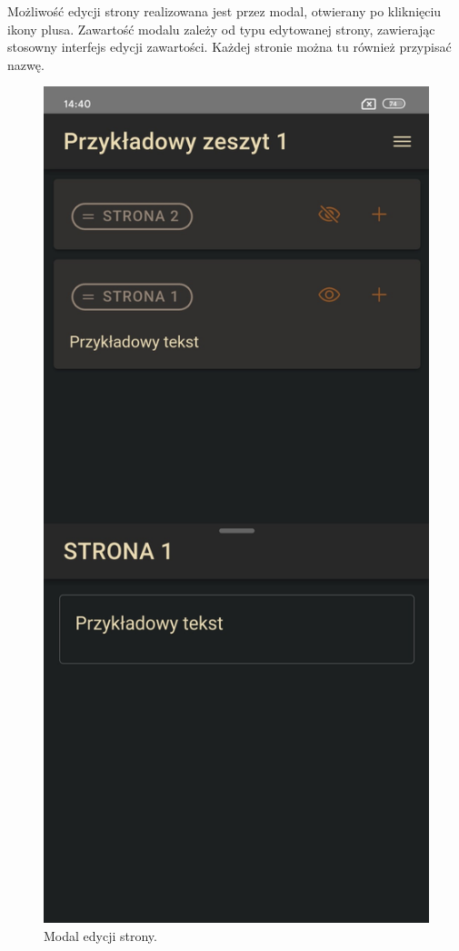 Możliwość edycji strony realizowana jest przez modal, otwierany po kliknięciu ikony plusa. Zawartość modalu zależy od
typu edytowanej strony, zawierając stosowny interfejs edycji zawartości. Każdej stronie można tu również przypisać nazwę.

\begin{figure}[H]
	\begin{center}
		\includegraphics[scale=0.2]{media/EditorModal.jpg}
	\end{center}
	\caption{Modal edycji strony.}
	\label{rys:editor-modal}
\end{figure}

